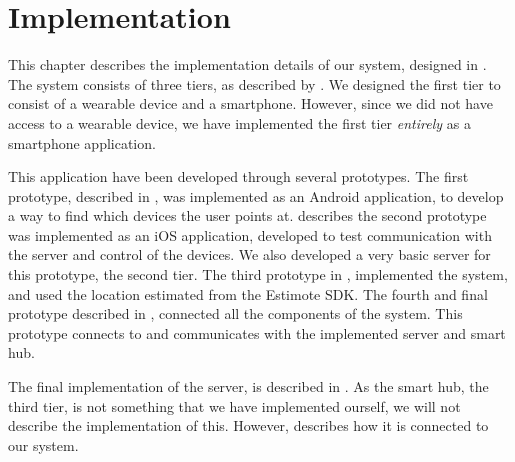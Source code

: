 \chapter{Implementation}\label{chap:implementation}
%
This chapter describes the implementation details of our system, 
designed in . 
The system consists of three tiers, as described by .
We designed the first tier to consist of a wearable device and a smartphone. 
However, since we did not have access to a wearable device, 
we have implemented the first tier \emph{entirely} as a smartphone application. 

This application have been developed through several prototypes. 
The first prototype, described in , 
was implemented as an Android application, 
to develop a way to find which devices the user points at. 
 describes the second prototype was implemented as an iOS application,
developed to test communication with the server and control of the devices. 
We also developed a very basic server for this prototype, \ie the second tier. 
The third prototype in , 
implemented the \threedollar system,
and used the location estimated from the Estimote SDK. 
The fourth and final prototype described in , 
connected all the components of the system. 
This prototype connects to and communicates with the implemented server and smart hub. 

The final implementation of the server,
is described in . 
As the smart hub, the third tier, is not something that we have implemented ourself, 
we will not describe the implementation of this.
However,  describes how it is connected to our system. 


\FloatBarrier

\FloatBarrier

\FloatBarrier

\FloatBarrier
